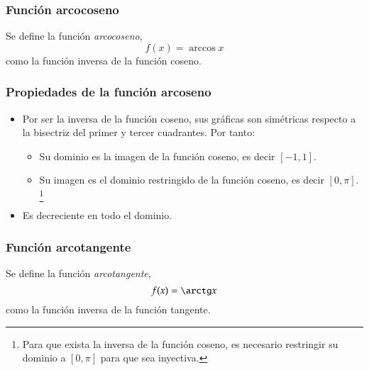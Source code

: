 \begin{frame}
\frametitle{Función arcocoseno}
\begin{definicion}
Se define la función \emph{arcocoseno},
\[f(x)=\arccos x\]
como la función inversa de la función coseno.
\end{definicion}
\begin{center}
\scalebox{1}{}
\end{center}
\end{frame} 


\begin{frame}
\frametitle{Propiedades de la función arcoseno}
\begin{itemize}
\item Por ser la inversa de la función coseno, sus gráficas son simétricas respecto a la bisectriz del primer y tercer
cuadrantes. Por tanto:
\begin{itemize}
\item Su dominio es la imagen de la función coseno, es decir $[-1,1]$.
\item Su imagen es el dominio restringido de la función coseno, es decir $[0,\pi]$.
\footnote{Para que exista la inversa de la función coseno, es necesario restringir su dominio a $[0,\pi]$ para que sea inyectiva.}
\end{itemize}
\item Es decreciente en todo el dominio.
\end{itemize}
\end{frame} 


\begin{frame}
\frametitle{Función arcotangente}
\begin{definicion}
Se define la función \emph{arcotangente},
\[f(x)=\arctg x\]
como la función inversa de la función tangente.
\end{definicion}
\begin{center}
\scalebox{1}{}
\end{center}
\end{frame} 


